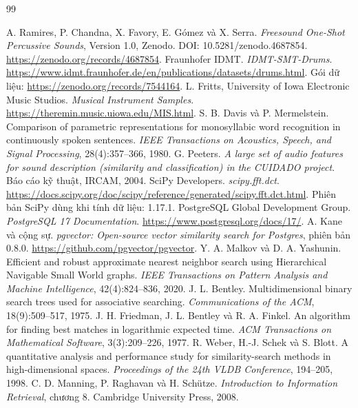 \documentclass[11pt,a4paper]{article}
\begin{document}
\begin{thebibliography}{99}
 A. Ramires, P. Chandna, X. Favory, E. Gómez và X. Serra. \emph{Freesound One-Shot Percussive Sounds}, Version 1.0, Zenodo. DOI: 10.5281/zenodo.4687854. \url{https://zenodo.org/records/4687854}.
 Fraunhofer IDMT. \emph{IDMT-SMT-Drums}. \url{https://www.idmt.fraunhofer.de/en/publications/datasets/drums.html}. Gói dữ liệu: \url{https://zenodo.org/records/7544164}.
 L. Fritts, University of Iowa Electronic Music Studios. \emph{Musical Instrument Samples}. \url{https://theremin.music.uiowa.edu/MIS.html}.
 S. B. Davis và P. Mermelstein. Comparison of parametric representations for monosyllabic word recognition in continuously spoken sentences. \emph{IEEE Transactions on Acoustics, Speech, and Signal Processing}, 28(4):357--366, 1980.
 G. Peeters. \emph{A large set of audio features for sound description (similarity and classification) in the CUIDADO project}. Báo cáo kỹ thuật, IRCAM, 2004.
 SciPy Developers. \emph{scipy.fft.dct}. \url{https://docs.scipy.org/doc/scipy/reference/generated/scipy.fft.dct.html}. Phiên bản SciPy dùng khi tính dữ liệu: 1.17.1.
 PostgreSQL Global Development Group. \emph{PostgreSQL 17 Documentation}. \url{https://www.postgresql.org/docs/17/}.
 A. Kane và cộng sự. \emph{pgvector: Open-source vector similarity search for Postgres}, phiên bản 0.8.0. \url{https://github.com/pgvector/pgvector}.
 Y. A. Malkov và D. A. Yashunin. Efficient and robust approximate nearest neighbor search using Hierarchical Navigable Small World graphs. \emph{IEEE Transactions on Pattern Analysis and Machine Intelligence}, 42(4):824--836, 2020.
 J. L. Bentley. Multidimensional binary search trees used for associative searching. \emph{Communications of the ACM}, 18(9):509--517, 1975.
 J. H. Friedman, J. L. Bentley và R. A. Finkel. An algorithm for finding best matches in logarithmic expected time. \emph{ACM Transactions on Mathematical Software}, 3(3):209--226, 1977.
 R. Weber, H.-J. Schek và S. Blott. A quantitative analysis and performance study for similarity-search methods in high-dimensional spaces. \emph{Proceedings of the 24th VLDB Conference}, 194--205, 1998.
 C. D. Manning, P. Raghavan và H. Schütze. \emph{Introduction to Information Retrieval}, chương 8. Cambridge University Press, 2008.
\end{thebibliography}
\end{document}
